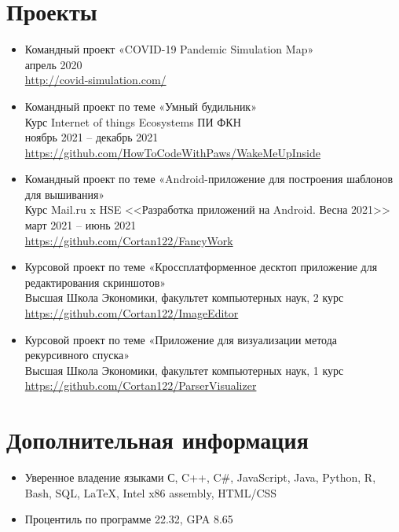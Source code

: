 \documentclass[12pt]{article}
\begin{document}
  \section{Проекты}
  \begin{itemize}
    \item Командный проект «COVID-19 Pandemic Simulation Map» \\
    апрель 2020 \\
    \url{http://covid-simulation.com/}

    \item Командный проект по теме «Умный будильник» \\
    Курс Internet of things Ecosystems ПИ ФКН \\
    ноябрь 2021 -- декабрь 2021 \\
    \url{https://github.com/HowToCodeWithPaws/WakeMeUpInside}

    \item Командный проект по теме «Android-приложение для построения шаблонов для вышивания» \\
    Курс Mail.ru x HSE <<Разработка приложений на Android. Весна 2021>> \\
    март 2021 -- июнь 2021 \\
    \url{https://github.com/Cortan122/FancyWork}

    \item Курсовой проект по теме «Кроссплатформенное десктоп приложение для редактирования скриншотов» \\
    Высшая Школа Экономики, факультет компьютерных наук, 2 курс \\
    \url{https://github.com/Cortan122/ImageEditor}

    \item Курсовой проект по теме «Приложение для визуализации метода рекурсивного спуска» \\
    Высшая Школа Экономики, факультет компьютерных наук, 1 курс \\
    \url{https://github.com/Cortan122/ParserVisualizer}

  \end{itemize}

  \section{Дополнительная информация}
  \begin{itemize}
    \item Уверенное владение языками С, C++, C\#, JavaScript, Java, Python, R, Bash, SQL, \LaTeX, Intel x86 assembly, HTML/CSS
    \item Процентиль по программе 22.32, GPA 8.65
  \end{itemize}
\end{document}
